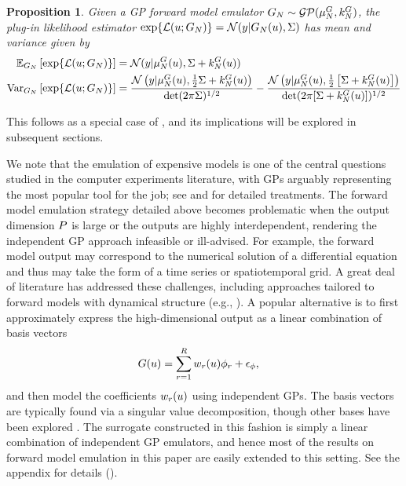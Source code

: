 \documentclass[12pt]{article}
\newtheorem{prop}{Proposition}
\begin{document}
\begin{prop} \label{fwd_em_lik_emulator_moments_Gaussian}
Given a GP forward model emulator $\fwdEm[\Ndesign] \sim \GP(\emMean[\Ndesign]{\fwd}, \emKer[\Ndesign]{\fwd})$, 
the plug-in likelihood estimator $\Exp{\llik(\Par; \fwdEm)} = \Gaussian(\obs| \fwdEm[\Ndesign](\Par), \likPar)$ has 
mean and variance given by 
\begin{align}
\E_{\fwdEm}\left[\Exp{\llik(\Par; \fwdEm)} \right] 
&= \Gaussian(\obs | \emMean[\Ndesign]{\fwd}(\Par), \likPar + \emKer[\Ndesign]{\fwd}(\Par)) \\
\Var_{\fwdEm}\left[\Exp{\llik(\Par; \fwdEm)} \right]
&= \frac{\Gaussian\left(\obs | \emMean[\Ndesign]{\fwd}(\Par), \frac{1}{2}\likPar + \emKer[\Ndesign]{\fwd}(\Par)  \right)}{\det(2\pi \likPar)^{1/2}}
- \frac{\Gaussian\left(\obs | \emMean[\Ndesign]{\fwd}(\Par), \frac{1}{2}\left[\likPar + \emKer[\Ndesign]{\fwd}(\Par)\right]  \right)}{\det(2\pi [\likPar + \emKer[\Ndesign]{\fwd}(\Par)])^{1/2}}
\end{align}
\end{prop}
This follows as a special case of , and its implications will be explored in subsequent sections. 

We note that the emulation of expensive models is one of the central questions studied in the 
computer experiments literature, with GPs arguably representing the most popular tool 
for the job; see \cite{gramacy2020surrogates} and 
\cite{design_analysis_computer_experiments} for detailed treatments.
The forward model emulation strategy detailed above becomes problematic when the output 
dimension $\dimObs$ is large or the outputs are highly interdependent, rendering the independent GP 
approach infeasible or ill-advised.
For example, the forward model output may correspond to the numerical solution of 
a differential equation and thus may take the form of a time series or spatiotemporal grid. 
A great deal of literature has addressed these challenges, including approaches tailored to forward models
with dynamical structure 
(e.g., \cite{GP_dynamic_emulation, Bayesian_emulation_dynamic, Liu_West_dynamic_emulation, dynamic_nonlinear_simulators_GP}).
A popular alternative is to first approximately express the high-dimensional output as a linear combination of basis vectors 
\begin{align}
\fwd(\Par) &= \sum_{\idxBasis=1}^{\dimBasis} \basisWeight_{\idxBasis}(\Par) \basisVec_{\idxBasis} + \noise_{\basisVec}, \label{fwd_model_basis_func}
\end{align}
and then model the coefficients $\basisWeight_{\idxBasis}(\Par)$ using independent GPs. The basis vectors 
are typically found via a singular value decomposition, though other bases have been explored 
\citep{HigdonBasis, emulate_functional_output, functionValuedModels, PODemulation}. The surrogate constructed in 
this fashion is simply a linear combination of independent GP emulators, and hence most of the results on forward model 
emulation in this paper are easily extended to this setting. See the appendix for details (\todo). 
\end{document}
